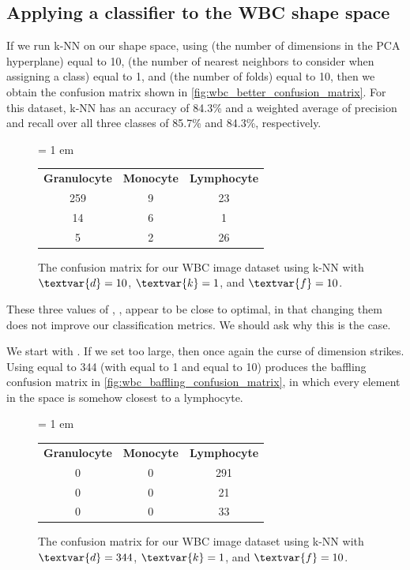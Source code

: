 \subsection{Applying a classifier to the WBC shape space}

If we run k-NN on our shape space, using  (the number of dimensions in the PCA hyperplane) equal to 10,  (the number of nearest neighbors to consider when assigning a class) equal to 1, and  (the number of folds) equal to 10, then we obtain the confusion matrix shown in \autoref{fig:wbc_better_confusion_matrix}. For this dataset, k-NN has an accuracy of 84.3\% and a weighted average of precision and recall over all three classes of 85.7\% and 84.3\%, respectively.\\

\begin{figure}[h]
\centering
\tabcolsep = 1 em
\mySfFamily
\begin{tabular}{c c c}
\textbf{Granulocyte} & \textbf{Monocyte} & \textbf{Lymphocyte} \\
259 & 9 & 23 \\
14 & 6 & 1 \\
5 & 2 & 26
\end{tabular}
\caption{The confusion matrix for our WBC image dataset using k-NN with $\textvar{d} = \text{10}$, $\textvar{k} = \text{1}$, and $\textvar{f} = \text{10}$.}
\label{fig:wbc_better_confusion_matrix}
\end{figure}

These three values of , ,  appear to be close to optimal, in that changing them does not improve our classification metrics. We should ask why this is the case.

We start with . If we set  too large, then once again the curse of dimension strikes. Using  equal to 344 (with  equal to 1 and  equal to 10) produces the baffling confusion matrix in \autoref{fig:wbc_baffling_confusion_matrix}, in which every element in the space is somehow closest to a lymphocyte.

\begin{figure}[h]
\centering
\tabcolsep = 1 em
\mySfFamily
\begin{tabular}{c c c}
\textbf{Granulocyte} & \textbf{Monocyte} & \textbf{Lymphocyte} \\
0 & 0 & 291 \\
0 & 0 & 21 \\
0 & 0 & 33
\end{tabular}
\caption{The confusion matrix for our WBC image dataset using k-NN with $\textvar{d} = \text{344}$, $\textvar{k} = \text{1}$, and $\textvar{f} = \text{10}$.}
\label{fig:wbc_baffling_confusion_matrix}
\end{figure}

